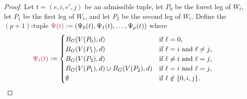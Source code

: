 \documentclass{patmorin}
\DeclareMathOperator{\thick}{th}
\begin{document}
\begin{proof}







Let $t=(e,i,e',j)$ be an admissible tuple,
let $P_0$ be the forest leg of $W_t$,
let $P_1$ be the first leg of $W_t$, and
let $P_2$ be the second leg of $W_t$.
Define the $(p+1)$-tuple $\mathdefin{\Psi(t)}:=(\Psi_0(t),\Psi_1(t),\ldots,\Psi_p(t))$ where
\begin{align*}
\mathdefin{\Psi_\ell(t)} &:=\begin{cases}
B_G(V(P_0),d)&\textrm{if $\ell=0$,}\\
B_G(V(P_1),d)&\textrm{if $\ell=i$ and $\ell\neq j$,}\\
B_G(V(P_2),d)&\textrm{if $\ell\neq i$ and $\ell= j$,}\\
B_G(V(P_1),d)\cup B_G(V(P_2),d)&\textrm{if $\ell= i$ and $\ell= j$,}\\
\emptyset&\textrm{if $\ell\notin\{0,i,j\}$.}
\end{cases}
\end{align*}


\end{proof}
\end{document}
